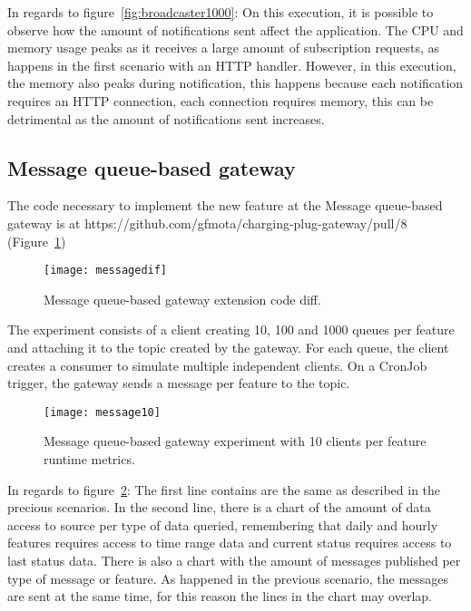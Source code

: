 In regards to figure~\ref{fig:broadcaster1000}: On this execution, it is possible to observe how the amount of notifications sent affect the application. The CPU and memory usage peaks as it receives a large amount of subscription requests, as happens in the first scenario with an HTTP handler. However, in this execution, the memory also peaks during notification, this happens because each notification requires an HTTP connection, each connection requires memory, this can be detrimental as the amount of notifications sent increases.

\subsection*{Message queue-based gateway}
\label{sec:messageresult}

The code necessary to implement the new feature at the Message queue-based gateway is at https://github.com/gfmota/charging-plug-gateway/pull/8 (Figure~\ref{fig:messagedif})

\begin{figure}
    \centering
    \texttt{[image: messagedif]}
    \caption{Message queue-based gateway extension code diff.\label{fig:messagedif}}
\end{figure}

The experiment consists of a client creating 10, 100 and 1000 queues per feature and attaching it to the topic created by the gateway. For each queue, the client creates a consumer to simulate multiple independent clients. On a CronJob trigger, the gateway sends a message per feature to the topic.

\begin{figure}
    \centering
    \texttt{[image: message10]}
    \caption{Message queue-based gateway experiment with 10 clients per feature runtime metrics.\label{fig:message10}}
\end{figure}

In regards to figure~\ref{fig:message10}: The first line contains are the same as described in the precious scenarios. In the second line, there is a chart of the amount of data access to source per type of data queried, remembering that daily and hourly features requires access to time range data and current status requires access to last status data. There is also a chart with the amount of messages published per type of message or feature. As happened in the previous scenario, the messages are sent at the same time, for this reason the lines in the chart may overlap.

